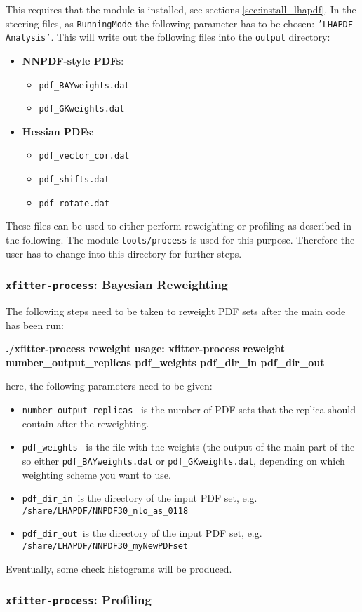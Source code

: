 This requires that the \lhapdf module is installed, see sections \ref{sec:install_lhapdf}. In the \fitter steering files, as {\tt RunningMode} the following parameter has to be chosen: {\tt 'LHAPDF Analysis'}. This will write out the following files into the {\tt output} directory:

\begin{itemize}
 \item \textbf{NNPDF-style PDFs}:
 \begin{itemize}
  \item {\tt pdf\_BAYweights.dat}
  \item {\tt pdf\_GKweights.dat}
 \end{itemize}
  \item \textbf{Hessian PDFs}:
 \begin{itemize}
   \item {\tt{pdf\_vector\_cor.dat}}
   \item {\tt{pdf\_shifts.dat}}
   \item {\tt{pdf\_rotate.dat}}  
\end{itemize}
\end{itemize}


These files can be used to either perform reweighting or profiling as described in the following. The module {\tt tools/process} is used for this purpose. Therefore the user has to change into this directory for further steps. 

\subsubsection{{\tt xfitter-process}: Bayesian Reweighting}

The following steps need to be taken to reweight PDF sets after the main code has been run:

\textbf{./xfitter-process reweight
usage: xfitter-process reweight number\_output\_replicas pdf\_weights pdf\_dir\_in pdf\_dir\_out}

here, the following parameters need to be given:
\begin{itemize}
\item {\tt number\_output\_replicas } is the number of PDF sets that the replica should contain after the reweighting. 
\item {\tt pdf\_weights  } is the file with the weights (the output of the main part of the \fitter so either {\tt pdf\_BAYweights.dat} or {\tt pdf\_GKweights.dat}, depending on which weighting scheme you want to use.
\item {\tt pdf\_dir\_in }is the directory of the input PDF set, e.g. {\tt /share/LHAPDF/NNPDF30\_nlo\_as\_0118}
\item {\tt pdf\_dir\_out }is the directory of the input PDF set, e.g. {\tt /share/LHAPDF/NNPDF30\_myNewPDFset}
\end{itemize}

Eventually, some check histograms will be produced.

\subsubsection{{\tt xfitter-process}: Profiling}


